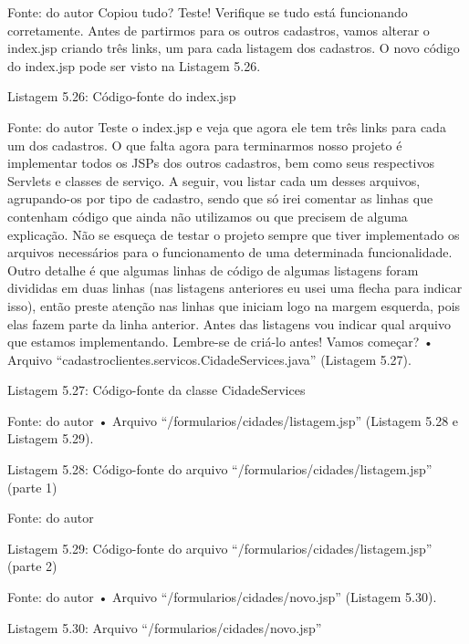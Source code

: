 Fonte: do autor
Copiou tudo? Teste! Verifique se tudo está funcionando corretamente. Antes de partirmos para os outros cadastros, vamos alterar o index.jsp criando três links, um para cada listagem dos cadastros. O novo código do index.jsp pode ser visto na Listagem 5.26.

Listagem 5.26: Código-fonte do index.jsp
 
Fonte: do autor
Teste o index.jsp e veja que agora ele tem três links para cada um dos cadastros. O que falta agora para terminarmos nosso projeto é implementar todos os JSPs dos outros cadastros, bem como seus respectivos Servlets e classes de serviço. A seguir, vou listar cada um desses arquivos, agrupando-os por tipo de cadastro, sendo que só irei comentar as linhas que contenham código que ainda não utilizamos ou que precisem de alguma explicação. Não se esqueça de testar o projeto sempre que tiver implementado os arquivos necessários para o funcionamento de uma determinada funcionalidade. Outro detalhe é que algumas linhas de código de algumas listagens foram divididas em duas linhas (nas listagens anteriores eu usei uma flecha para indicar isso), então preste atenção nas linhas que iniciam logo na margem esquerda, pois elas fazem parte da linha anterior. Antes das listagens vou indicar qual arquivo que estamos implementando. Lembre-se de criá-lo antes! Vamos começar?
•	Arquivo “cadastroclientes.servicos.CidadeServices.java” (Listagem 5.27).



Listagem 5.27: Código-fonte da classe CidadeServices
 
Fonte: do autor
•	Arquivo “/formularios/cidades/listagem.jsp” (Listagem 5.28 e Listagem 5.29).




Listagem 5.28: Código-fonte do arquivo “/formularios/cidades/listagem.jsp” (parte 1)
 
Fonte: do autor











Listagem 5.29: Código-fonte do arquivo “/formularios/cidades/listagem.jsp” (parte 2)
 
Fonte: do autor
•	Arquivo “/formularios/cidades/novo.jsp” (Listagem 5.30).








Listagem 5.30: Arquivo “/formularios/cidades/novo.jsp”
 
